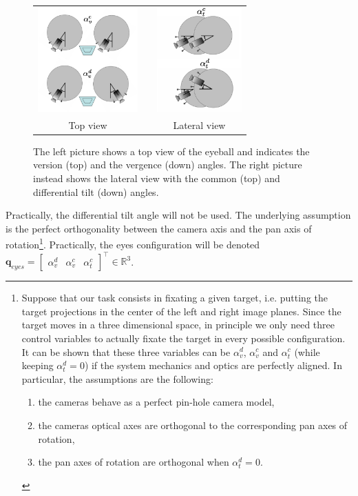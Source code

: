 \begin{figure}
  \begin{center}
	\begin{tabular}{ccc}
	  \parbox{60mm}{\includegraphics[height=40mm]{Figure/EyeVergenceVersion.eps}}  & &
	  \parbox{60mm}{\includegraphics[height=40mm]{Figure/EyeCommDiffTilt.eps}}
	  \\
	  Top view & & Lateral view
  \end{tabular}
\end{center}
\caption{The left picture shows a top view of the eyeball and indicates the version (top) and the vergence (down) angles. The right picture instead shows the lateral view with the common (top) and differential tilt (down) angles.}\label{Fig:EyeCoordinatedMovements}
  \end{figure}

Practically, the differential tilt angle will not be used. The underlying assumption is the perfect orthogonality between the camera axis and the pan axis of rotation\footnote{\samepage Suppose that our task consists in fixating a given target, i.e. putting the target projections in the center of the left and right image planes. Since the target moves in a three dimensional space, in principle we only need three control variables to actually fixate the target in every possible configuration. It can be shown that these three variables can be $\alpha_v^d$, $\alpha_v^c$ and $\alpha_t^c$ (while keeping $\alpha_t^d=0$) if the system mechanics and optics are perfectly aligned. In particular, the assumptions are the following:
\begin{enumerate}
\item the cameras behave as a perfect pin-hole camera model,
\item the cameras optical axes are orthogonal to the corresponding pan axes of rotation,
\item the pan axes of rotation are orthogonal when $\alpha_t^d=0$.
\end{enumerate}}. Practically, the eyes configuration will be denoted $\mathbf q_{eyes} = \begin{bmatrix} \alpha_v^d & \alpha_v^c & \alpha_t^c \end{bmatrix}^\top \in \mathbb R^3$.


